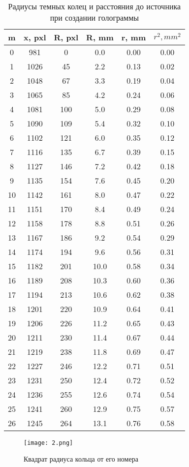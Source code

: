 \documentclass[a4paper, 12pt]{article}
\begin{document}
\begin{table}[H]
	\centering
	\begin{tabular}{|c|c|c|c|c|c|}
		\hline

m&x, pxl&R, pxl&R, mm&r, mm&$r^2, mm^2$\\ \hline
0&981&0&0.0&0.00&0.00\\ \hline
1&1026&45&2.2&0.13&0.02\\ \hline
2&1048&67&3.3&0.19&0.04\\ \hline
3&1065&85&4.2&0.24&0.06\\ \hline
4&1081&100&5.0&0.29&0.08\\ \hline
5&1090&109&5.4&0.32&0.10\\ \hline
6&1102&121&6.0&0.35&0.12\\ \hline
7&1116&135&6.7&0.39&0.15\\ \hline
8&1127&146&7.2&0.42&0.18\\ \hline
9&1135&154&7.6&0.45&0.20\\ \hline
10&1142&161&8.0&0.47&0.22\\ \hline
11&1151&170&8.4&0.49&0.24\\ \hline
12&1158&178&8.8&0.51&0.26\\ \hline
13&1167&186&9.2&0.54&0.29\\ \hline
14&1174&194&9.6&0.56&0.31\\ \hline
15&1182&201&10.0&0.58&0.34\\ \hline
16&1189&208&10.3&0.60&0.36\\ \hline
17&1194&213&10.6&0.62&0.38\\ \hline
18&1201&220&10.9&0.64&0.41\\ \hline
19&1206&226&11.2&0.65&0.43\\ \hline
20&1211&230&11.4&0.67&0.44\\ \hline
21&1219&238&11.8&0.69&0.47\\ \hline
22&1227&246&12.2&0.71&0.51\\ \hline
23&1231&250&12.4&0.72&0.52\\ \hline
24&1236&255&12.6&0.74&0.54\\ \hline
25&1241&260&12.9&0.75&0.57\\ \hline
26&1245&264&13.1&0.76&0.58\\ \hline
\end{tabular}
\caption{Радиусы темных колец и расстояния до источника при создании голограммы}
\end{table}

\begin{figure}[H]
	\centering
	\texttt{[image: 2.png]}
	\caption{Квадрат радиуса кольца от его номера}
\end{figure}
\end{document}
